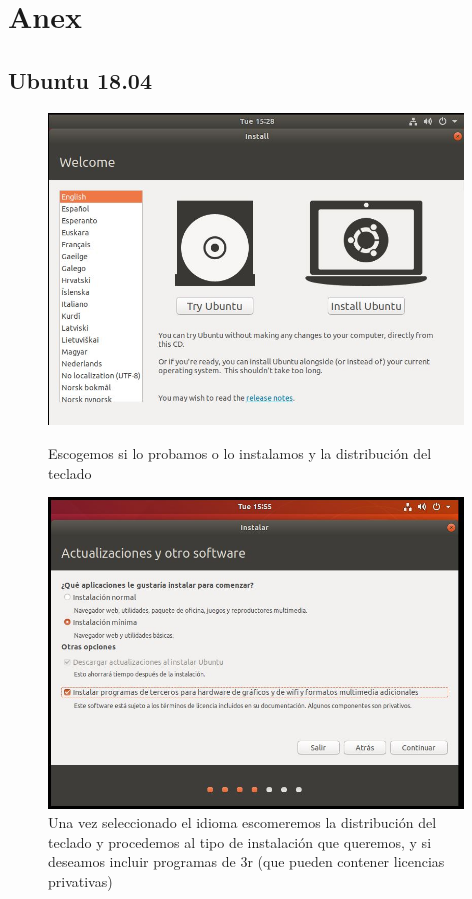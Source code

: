 \documentclass[preprint,11pt]{elsarticle}
\begin{document}
\clearpage
\section{Anex}
\subsection{Ubuntu 18.04}
\begin{figure}[!htbp]
    \begin{center}
        \includegraphics[width=11cm]{anex/ubuntu1.JPG}
    \end{center}
    \caption{Escogemos si lo probamos o lo instalamos y la distribución del teclado}
    \begin{center}
        \includegraphics[width=11cm]{anex/ubuntu2.JPG}
    \end{center}
    \caption{Una vez seleccionado el idioma escomeremos la distribución del teclado y procedemos al tipo de instalación que queremos, y si deseamos incluir programas de 3r (que pueden contener licencias privativas)}
\end{figure}
\end{document}

